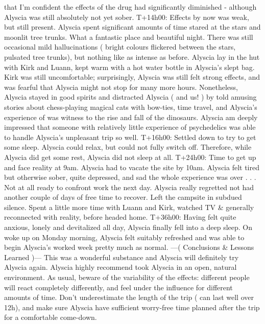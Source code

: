 \documentclass[12pt]{book}
\begin{document}
that I'm confident the effects of the drug had significantly diminished - although Alyscia was still absolutely not yet sober. T+14h00: Effects by now was weak, but still present. Alyscia spent significant amounts of time stared at the stars and moonlit tree trunks. What a fantastic place and beautiful night. There was still occasional mild hallucinations ( bright colours flickered between the stars, pulsated tree trunks), but nothing like as intense as before. Alyscia lay in the hut with Kirk and Luann, kept warm with a hot water bottle in Alyscia's slept bag. Kirk was still uncomfortable; surprisingly, Alyscia was still felt strong effects, and was fearful that Alyscia might not stop for many more hours. Nonetheless, Alyscia stayed in good spirits and distracted Alyscia ( and us! ) by told amusing stories about chess-playing magical cats with bow-ties, time travel, and Alyscia's experience of was witness to the rise and fall of the dinosaurs. Alyscia am deeply impressed that someone with relatively little experience of psychedelics was able to handle Alyscia's unpleasant trip so well. T+16h00: Settled down to try to get some sleep. Alyscia could relax, but could not fully switch off. Therefore, while Alyscia did get some rest, Alyscia did not sleep at all. T+24h00: Time to get up and face reality at 9am. Alyscia had to vacate the site by 10am. Alyscia felt tired but otherwise sober, quite depressed, and sad the whole experience was over . . .  Not at all ready to confront work the next day. Alyscia really regretted not had another couple of days of free time to recover. Left the campsite in subdued silence. Spent a little more time with Luann and Kirk, watched TV \& generally reconnected with reality, before headed home. T+36h00: Having felt quite anxious, lonely and devitalized all day, Alyscia finally fell into a deep sleep. On woke up on Monday morning, Alyscia felt suitably refreshed and was able to begin Alyscia's worked week pretty much as normal. ---( Conclusions \& Lessons Learned )--- This was a wonderful substance and Alyscia will definitely try Alyscia again. Alyscia highly recommend took Alyscia in an open, natural environment. As usual, beware of the variability of the effects: different people will react completely differently, and feel under the influence for different amounts of time. Don't underestimate the length of the trip ( can last well over 12h), and make sure Alyscia have sufficient worry-free time planned after the trip for a comfortable come-down.
\end{document}
